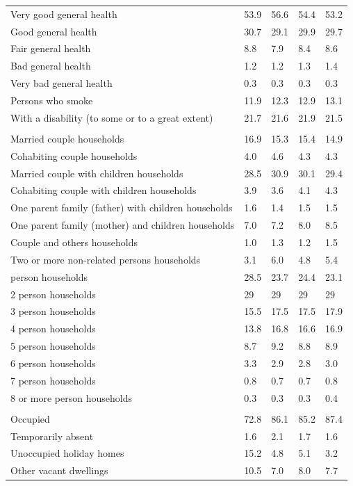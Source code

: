 \documentclass{article}
\begin{document}
\begin{table}[h]
\begin{tabular}{KTTTT}
    \hline
Very good general health & 53.9& 56.6&54.4& 53.2\\
Good general health & 30.7& 29.1& 29.9& 29.7\\
Fair general health & 8.8& 7.9&8.4& 8.6\\
Bad general health & 1.2& 1.2&1.3& 1.4\\
Very bad general health & 0.3& 0.3&0.3& 0.3\\
    \hline
Persons who smoke & 11.9& 12.3&12.9& 13.1\\
    \hline
With a disability (to some or to a great extent) & 21.7& 21.6&21.9& 21.5\\
\hline
    \\ 
    \hline
Married couple households & 16.9& 15.3& 15.4& 14.9\\
Cohabiting couple households & 4.0& 4.6& 4.3& 4.3\\
Married couple with children households & 28.5& 30.9& 30.1& 29.4\\
Cohabiting couple with children households & 3.9& 3.6& 4.1& 4.3\\
One parent family (father) with  children households & 1.6& 1.4& 1.5& 1.5\\
One parent family (mother) and children households & 7.0& 7.2& 8.0& 8.5\\
Couple and others households  & 1.0& 1.3& 1.2& 1.5\\
Two or more non-related persons households & 3.1& 6.0& 4.8& 5.4\\
     person households & 28.5& 23.7& 24.4& 23.1\\
2 person households & 29& 29& 29& 29\\
3 person households & 15.5& 17.5& 17.5& 17.9\\
4 person households & 13.8& 16.8& 16.6& 16.9\\
5 person households & 8.7& 9.2& 8.8& 8.9\\
6 person households & 3.3& 2.9& 2.8& 3.0\\
7 person households & 0.8& 0.7& 0.7& 0.8\\
8 or more person households & 0.3& 0.3& 0.3& 0.4\\
\hline
    \\ 
    \hline
Occupied & 72.8& 86.1& 85.2& 87.4\\
Temporarily absent & 1.6& 2.1& 1.7& 1.6\\
Unoccupied holiday homes & 15.2&  4.8&  5.1&  3.2\\
Other vacant dwellings & 10.5&  7.0&  8.0&  7.7\\
\hline
\end{tabular}
\end{table}
\end{document}
